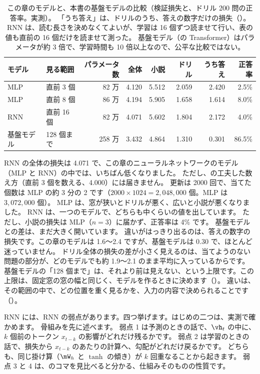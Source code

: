 \begin{table}[tbp]
\centering
\caption{この章のモデルと、本書の基盤モデルの比較（検証損失と、ドリル 200 問の正答率。実測）。
「うち答え」は、ドリルのうち、答えの数字だけの損失（）。
RNN は、読む長さを決めなくてよいが、学習は 16 個ずつ読ませて行い、表の値も直前の 16 個だけを読ませて測った。
基盤モデル（の Transformer）はパラメータが約 3 倍で、学習時間も 10 倍以上なので、公平な比較ではない。}
\label{tab:emb-rnn}
\small
\begin{tabular}{llrrrrrr}
\toprule
モデル & 見る範囲 & パラメータ数 & 全体 & 小説 & ドリル & うち答え & 正答率 \\
\midrule
MLP & 直前 3 個 & 82 万 & 4.120 & 5.512 & 2.059 & 2.420 & 2.5\% \\
MLP & 直前 8 個 & 86 万 & 4.194 & 5.905 & 1.658 & 1.614 & 8.0\% \\
RNN & 直前 16 個 & 82 万 & 4.071 & 5.602 & 1.804 & 2.172 & 4.0\% \\
\midrule
基盤モデル & 128 個まで & 258 万 & 3.432 & 4.864 & 1.310 & 0.301 & 86.5\% \\
\bottomrule
\end{tabular}
\end{table}

RNN の全体の損失は 4.071 で、この章のニューラルネットワークのモデル（MLP と RNN）の中では、いちばん低くなりました。
ただし、の工夫した数え方（直前 3 個を数える、4.000）には届きません。
更新は 2000 回で、当てた個数は MLP の約 3 分の 2 です（$2000\times1024=2{,}048{,}000$ 個。MLP は $3{,}072{,}000$ 個）。
MLP は、窓が狭いとドリルが悪く、広いと小説が悪くなりました。
RNN は、一つのモデルで、どちらも中くらいの値を出しています。
ただし、小説の損失は MLP（$n=3$）に届かず、正答率は 4\% です。
基盤モデルとの差は、まだ大きく開いています。
違いがはっきり出るのは、答えの数字の損失です。この章のモデルは 1.6〜2.4 ですが、基盤モデルは 0.30 で、ほとんど迷っていません。
ドリル全体の損失の差が小さく見えるのは、当てようのない問題の部分が、どのモデルでも約 1.9〜2.1 のまま平均に入っているからです。
基盤モデルの「128 個まで」は、それより前は見えない、という上限です。この上限は、固定窓の窓の幅と同じく、モデルを作るときに決めます（）。
違いは、その範囲の中で、どの位置を重く見るかを、入力の内容で決められることです（）。

RNN には、RNN の弱点があります。四つ挙げます。はじめの二つは、実測で確かめます。
骨組みを先に述べます。
弱点 1 は予測のときの話で、$\vh_t$ の中に、$k$ 個前のトークン $x_{t-k}$ の影響がどれだけ残るかです。
弱点 2 は学習のときの話で、損失から $x_{t-k}$ のあたりの計算へ、勾配がどれだけ戻るかです。
どちらも、同じ掛け算（$\mW_h$ と $\tanh$ の傾き）が $k$ 回重なることから起きます。
弱点 3 と 4 は、のコマを見比べると分かる、仕組みそのものの性質です。

